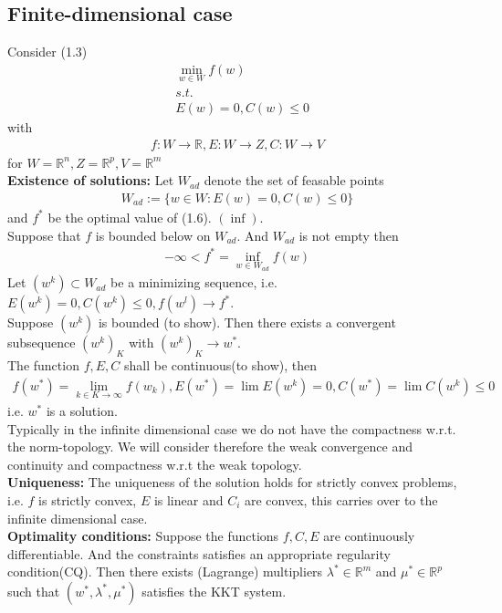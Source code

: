 \documentclass[a4paper,11pt,fleqn]{book}
\theoremstyle{definition}
\theoremstyle{remark}
\begin{document}
\subsection{Finite-dimensional case}
Consider (1.3)
\begin{align*}
	& \min_{w \in W} f(w)\\
	& s.t.\\
	& E(w) = 0, C(w) \le 0
\end{align*}
with 
\begin{align}
	f: W \rightarrow \mathbb{R}, E: W \rightarrow Z, C: W \rightarrow V
\end{align}
for $W = \mathbb{R}^n, Z = \mathbb{R}^p, V = \mathbb{R}^m$\\
\textbf{Existence of solutions:}
Let $W_{ad}$ denote the set of feasable points 
\begin{align*}
	W_{ad}:= \{ w \in W: E(w) = 0, C(w) \le 0\}
\end{align*}
and $f^*$ be the optimal value of (1.6). $(\inf)$. \\
Suppose that $f$ is bounded below on $W_{ad}$. And $W_{ad}$ is not empty then
\begin{align*}
	- \infty < f^* = \inf_{w \in W_{ad}} f(w)
\end{align*}
Let $(w^k) \subset W_{ad}$ be a minimizing sequence, i.e. $E(w^k) = 0, C(w^k) \le 0, f(w^l) \rightarrow f^*$. \\
Suppose $(w^k)$ is bounded (to show). Then there exists a convergent subsequence $(w^k)_K$ with $(w^k)_K \rightarrow w^*$. \\
The function $f, E, C$ shall be continuous(to show), then 
\begin{align*}
	f(w^*) = \lim_{k \in K \rightarrow \infty} f(w_k), 
	E(w^*) = \lim E(w^k) = 0, 
	C(w^*) = \lim C(w^k) \le 0
\end{align*}
i.e. $w^*$ is a solution. \\
Typically in the infinite dimensional case we do not have the compactness w.r.t. the norm-topology. We will consider therefore the weak convergence and continuity and compactness w.r.t the weak topology. \\
\textbf{Uniqueness:} The uniqueness of the solution holds for strictly convex problems, i.e. $f$ is strictly convex, $E$ is linear and $C_i$ are convex, this carries over to the infinite dimensional case. \\
\textbf{Optimality conditions: }
Suppose the functions $f, C, E$ are continuously differentiable. And the constraints satisfies an appropriate regularity condition(CQ). Then there exists (Lagrange) multipliers $\lambda^*\in \mathbb{R}^m$ and $\mu^* \in \mathbb{R}^p$ such that $(w^*, \lambda^*, \mu^*)$ satisfies the KKT system. 
\end{document}
